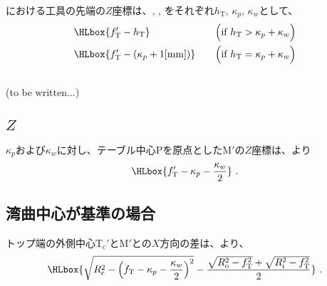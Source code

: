 \subsubsection{\TopOutcutLength}
\TopOutcut における工具の先端の$Z$座標は、\TopOutcutLength, \KeywayPos, \KeywayWidth をそれぞれ$h_\mathrm T$, $\kappa_p$, $\kappa_w$として、
\begin{alignat*}{3}
  & \HLbox{f_\mathrm T'-h_\mathrm T} & \quad & \Big(\text{if}~h_\mathrm T > \kappa_p+\kappa_w\Big)\\
  & \HLbox{f_\mathrm T'-\left(\kappa_p+1[\mathrm{mm}]\right)} & \quad  & \Big(\text{if}~h_\mathrm T = \kappa_p+\kappa_w\Big)
\end{alignat*}


\subsection{\CurvedOutcut\TBW}
(to be written...)



\clearpage


\subsection{\KeywayCenter\texorpdfstring{$Z$}{Z}}
\KeywayPos$\kappa_p$および\KeywayWidth$\kappa_w$に対し、テーブル中心Pを原点とした\KeywayCenter M$'$の$Z$座標は、より
\begin{align*}
  \HLbox{f_\mathrm T'-\kappa_p-\frac{\kappa_w}2}\ .
\end{align*}


\subsection{湾曲中心が基準の場合}
トップ端の外側中心T$_\mathrm c'$と\KeywayCenter M$'$との$X$方向の差は、より、
\begin{align*}
  \HLbox{%
    \sqrt{R_\mathrm c^2-\left(f_\mathrm T-\kappa_p-\frac{\kappa_w}2\right)^2}
    -\frac{\sqrt{R_\mathrm o^2-f_\mathrm T^2}+\sqrt{R_\mathrm i^2-f_\mathrm T^2}}2%
  }\ .
\end{align*}


